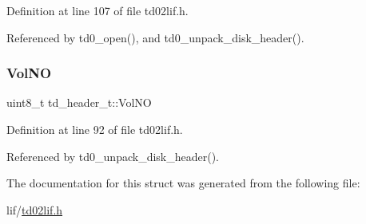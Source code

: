 Definition at line 107 of file td02lif.\+h.



Referenced by td0\+\_\+open(), and td0\+\_\+unpack\+\_\+disk\+\_\+header().

\mbox{\label{structtd__header__t_a081c4518281071d65fe82f6c8260b1f5}} 
\subsubsection{\texorpdfstring{Vol\+NO}{VolNO}}
{\footnotesize\ttfamily uint8\+\_\+t td\+\_\+header\+\_\+t\+::\+Vol\+NO}



Definition at line 92 of file td02lif.\+h.



Referenced by td0\+\_\+unpack\+\_\+disk\+\_\+header().



The documentation for this struct was generated from the following file\+:\begin{DoxyCompactItemize}
\item 
lif/\hyperlink{td02lif_8h}{td02lif.\+h}\end{DoxyCompactItemize}
